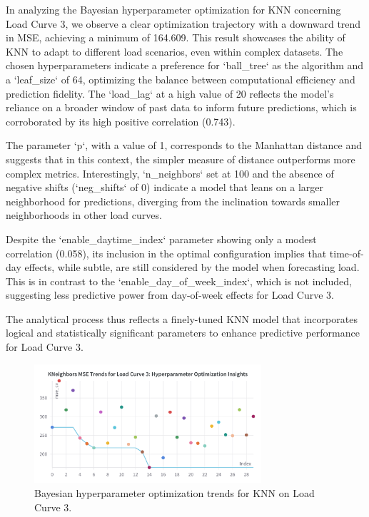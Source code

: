 \documentclass{article} %
\begin{document}
In analyzing the Bayesian hyperparameter optimization for \gls{KNN} concerning Load Curve 3, we observe a clear optimization trajectory with a downward trend in \gls{MSE}, achieving a minimum of 164.609. This result showcases the ability of \gls{KNN} to adapt to different load scenarios, even within complex datasets. The chosen hyperparameters indicate a preference for `ball\_tree` as the algorithm and a `leaf\_size` of 64, optimizing the balance between computational efficiency and prediction fidelity. The `load\_lag` at a high value of 20 reflects the model's reliance on a broader window of past data to inform future predictions, which is corroborated by its high positive correlation (0.743).

The parameter `p`, with a value of 1, corresponds to the Manhattan distance and suggests that in this context, the simpler measure of distance outperforms more complex metrics. Interestingly, `n\_neighbors` set at 100 and the absence of negative shifts (`neg\_shifts` of 0) indicate a model that leans on a larger neighborhood for predictions, diverging from the inclination towards smaller neighborhoods in other load curves.

Despite the `enable\_daytime\_index` parameter showing only a modest correlation (0.058), its inclusion in the optimal configuration implies that time-of-day effects, while subtle, are still considered by the model when forecasting load. This is in contrast to the `enable\_day\_of\_week\_index`, which is not included, suggesting less predictive power from day-of-week effects for Load Curve 3.

The analytical process thus reflects a finely-tuned \gls{KNN} model that incorporates logical and statistically significant parameters to enhance predictive performance for Load Curve 3.

\begin{figure}[H]
    \centering
    \includegraphics[width=0.75\textwidth]{ressources/Hyperparams/KNN/KNeighbors MSE Trends for Load Curve 3 Hyperparameter Optimization Insights.png}
    \caption{Bayesian hyperparameter optimization trends for KNN on Load Curve 3.}
    \label{fig:knn_lc3}
\end{figure}
\end{document}
